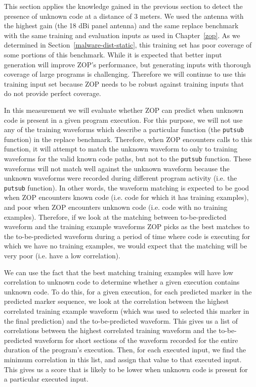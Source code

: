 This section applies the knowledge gained in the previous section to detect the presence of unknown code at a distance of 3 meters. We used the antenna with the highest gain (the 18 dBi panel antenna) and the same replace benchmark with the same training and evaluation inputs as used in Chapter~\ref{zop}. As we determined in Section~\ref{malware-dist-static}, this training set has poor coverage of some portions of this benchmark. While it is expected that better input generation will improve ZOP's performance, but generating inputs with thorough coverage of large programs is challenging. Therefore we will continue to use this training input set because ZOP needs to be robust against training inputs that do not provide perfect coverage. 

In this measurement we will evaluate whether ZOP can predict when unknown code is present in a given program execution. For this purpose, we will not use any of the training waveforms which describe a particular function (the \texttt{putsub} function) in the replace benchmark. Therefore, when ZOP encounters calls to this function, it will attempt to match the unknown waveform to only to training waveforms for the valid known code paths, but not to the \texttt{putsub} function. These waveforms will not match well against the unknown waveform because the unknown waveforms were recorded during different program activity (i.e. the \texttt{putsub} function). In other words, the waveform matching is expected to be good when ZOP encounters known code (i.e. code for which it has training examples), and poor when ZOP encounters unknown code (i.e. code with no training examples). Therefore, if we look at the matching between to-be-predicted waveform and the training example waveforms ZOP picks as the best matches to the to-be-predicted waveform during a period of time where code is executing for which we have no training examples, we would expect that the matching will be very poor (i.e. have a low correlation). 

We can use the fact that the best matching training examples will have low correlation to unknown code to determine whether a given execution contains unknown code. To do this, for a given execution, for each predicted marker in the predicted marker sequence, we look at the correlation between the highest correlated training example waveform (which was used to selected this marker in the final prediction) and the to-be-predicted waveform. This gives us a list of correlations between the highest correlated training waveform and the to-be-predicted waveform for short sections of the waveform recorded for the entire duration of the program's execution. Then, for each executed input, we find the minimum correlation in this list, and assign that value to that executed input. This gives us a score that is likely to be lower when unknown code is present for a particular executed input.

